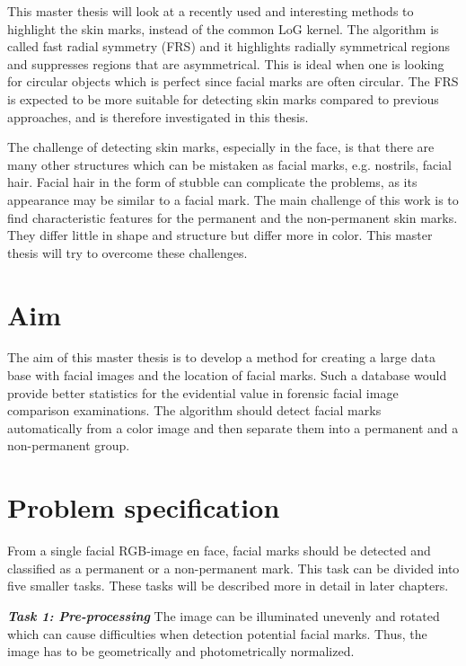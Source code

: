 This master thesis will look at a recently used and interesting methods to highlight the skin marks, instead of the common LoG kernel. The algorithm is called fast radial symmetry (FRS) \cite{twins,automatic_detector_2015} and it highlights radially symmetrical regions and suppresses regions that are asymmetrical. This is ideal when one is looking for circular objects which is perfect since facial marks are often circular. The FRS is expected to be more suitable for detecting skin marks compared to previous approaches, and is therefore investigated in this thesis.

The challenge of detecting skin marks, especially in the face, is that there are many other structures which can be mistaken as facial marks, e.g. nostrils, facial hair. Facial hair in the form of stubble can complicate the problems, as its appearance may be similar to a facial mark. The main challenge of this work is to find characteristic features for the permanent and the non-permanent skin marks. They differ little in shape and structure but differ more in color. This master thesis will try to overcome these challenges. 


\section{Aim}

The aim of this master thesis is to develop a method for creating a large data base with facial images and the location of facial marks. Such a database would provide better statistics for the evidential value in forensic facial image comparison examinations. The algorithm should detect facial marks automatically from a color image and then separate them into a permanent and a non-permanent group.

\section{Problem specification}

From a single facial RGB-image en face, facial marks should be detected and classified as a permanent or a non-permanent mark. This task can be divided into five smaller tasks. These tasks will be described more in detail in later chapters.

\textbf{\textit{Task 1: Pre-processing}}
The image can be illuminated unevenly and rotated which can cause difficulties when detection potential facial marks. Thus, the image has to be geometrically and photometrically normalized. 

